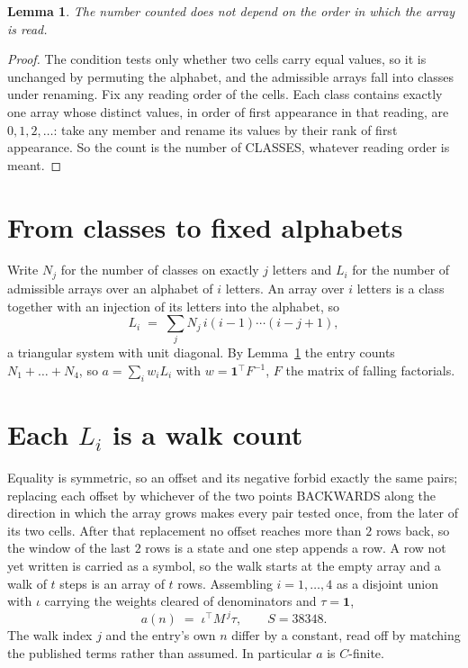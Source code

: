 \documentclass[11pt,a4paper]{article}
\theoremstyle{plain}
\newtheorem{lemma}[theorem]{Lemma}
\theoremstyle{definition}
\begin{document}
\begin{lemma}\label{lem:order}
The number counted does not depend on the order in which the array is read.
\end{lemma}

\begin{proof}
The condition tests only whether two cells carry equal values, so it is unchanged by permuting
the alphabet, and the admissible arrays fall into classes under renaming. Fix any reading order
of the cells. Each class contains exactly one array whose distinct values, in order of first
appearance in that reading, are $0,1,2,\dots$: take any member and rename its values by their
rank of first appearance. So the count is the number of CLASSES, whatever reading order is
meant.
\end{proof}

\section{From classes to fixed alphabets}

Write $N_j$ for the number of classes on exactly $j$ letters and $L_i$ for the number of
admissible arrays over an alphabet of $i$ letters. An array over $i$ letters is a class together
with an injection of its letters into the alphabet, so
\[
L_i\;=\;\sum_j N_j\,i(i-1)\cdots(i-j+1),
\]
a triangular system with unit diagonal. By Lemma~\ref{lem:order} the entry counts
$N_1+\dots+N_{4}$, so $a=\sum_i w_iL_i$ with $w=\mathbf{1}^{\!\top}F^{-1}$, $F$ the
matrix of falling factorials.

\section{Each $L_i$ is a walk count}

Equality is symmetric, so an offset and its negative forbid exactly the same pairs; replacing
each offset by whichever of the two points BACKWARDS along the direction in which the array
grows makes every pair tested once, from the later of its two cells. After that replacement no
offset reaches more than $2$ rows back, so the window of the last $2$
rows is a state and one step appends a row. A row not yet written is
carried as a symbol, so the walk starts at the empty array and a walk of $t$ steps is an array
of $t$ rows. Assembling $i=1,\dots,4$ as a disjoint union with $\iota$ carrying the
weights cleared of denominators and $\tau=\mathbf{1}$,
\[
a(n)\;=\;\iota^{\!\top}M^{\,j}\tau ,\qquad S=38348.
\]
The walk index $j$ and the entry's own $n$ differ by a constant, read off by matching the
published terms rather than assumed. In particular $a$ is $C$-finite.
\end{document}

